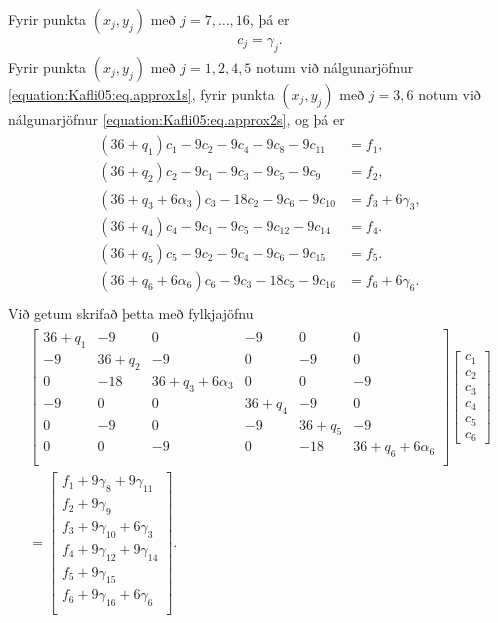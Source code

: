 \documentclass[a4paper,10pt,icelandic]{sphinxmanual}
\begin{document}
Fyrir punkta \((x_j,y_j)\) með  \(j=7,\dots, 16\), þá er
\begin{equation*}
\begin{split}c_j = \gamma_j.\end{split}
\end{equation*}
Fyrir punkta \((x_j,y_j)\) með \(j=1,2,4,5\) notum við nálgunarjöfnur \eqref{equation:Kafli05:eq.approx1s}, fyrir punkta \((x_j,y_j)\) með \(j=3,6\) notum við nálgunarjöfnur \eqref{equation:Kafli05:eq.approx2s}, og þá er
\begin{equation*}
\begin{split}\begin{aligned}
(36+q_1)c_1-9c_2-9c_4-9c_8-9c_{11}&=f_1,\\
(36+q_2)c_2-9c_1-9c_3-9c_5-9c_{9}&=f_2,\\
(36+q_3+6\alpha_3)c_3-18c_2-9c_6-9c_{10}&=f_3+6\gamma_3,\\
(36+q_4)c_4-9c_1-9c_5-9c_{12}-9c_{14}&=f_4.\\
(36+q_5)c_5-9c_2-9c_4-9c_{6}-9c_{15}&=f_5.\\
(36+q_6+6\alpha_6)c_6-9c_3-18c_{5}-9c_{16}&=f_6+6\gamma_6.\\
\end{aligned}\end{split}
\end{equation*}
Við getum skrifað þetta með fylkjajöfnu
\begin{equation*}
\begin{split}\begin{gathered}
\left[  \begin{matrix}
36+q_1&-9&0&-9& 0& 0\\
-9&36+q_2&-9&0&-9&0\\
0&-18&36+q_3+6\alpha_3&0&0&-9\\
-9&0&0&36+q_4&-9&0\\
0&-9&0&-9&36+q_5&-9\\
0&0&-9&0&-18&36+q_6+6\alpha_6\\
\end{matrix}\right]
\left[
\begin{matrix}
c_1\\c_2\\c_3\\c_4 \\ c_5 \\ c_6
\end{matrix}
\right]\\
=\left[
\begin{matrix}
f_1+9\gamma_8+9\gamma_{11}\\
f_2+9\gamma_{9}\\
f_3+9\gamma_{10}+6\gamma_3\\
f_4+9\gamma_{12}+9\gamma_{14}\\
f_5+9\gamma_{15}\\
f_6+9\gamma_{16}+6\gamma_6\\
\end{matrix}
\right].\end{gathered}\end{split}
\end{equation*}
\end{document}
